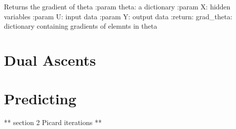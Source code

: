 \documentclass[letterpaper,10pt,english]{sphinxmanual}
\begin{document}
\begin{fulllineitems}
\label{\detokenize{sections/gradient_descents:utilities.GradientDescents.gradient_descent_theta}}
Returns the gradient of theta
:param theta: a dictionary
:param X: hidden variables
:param U: input data
:param Y: output data
:return: grad\_theta: dictionary containing gradients of elemnts in theta

\end{fulllineitems}



\chapter{Dual Ascents}
\label{\detokenize{sections/dual_ascents:dual-ascents}}\label{\detokenize{sections/dual_ascents:id1}}\label{\detokenize{sections/dual_ascents::doc}}\label{\detokenize{sections/dual_ascents:module-utilities.DualAscents}}

\chapter{Predicting}
\label{\detokenize{sections/prediction:predicting}}\label{\detokenize{sections/prediction:prediction}}\label{\detokenize{sections/prediction::doc}}
** section 2 Picard iterations **
\end{document}

